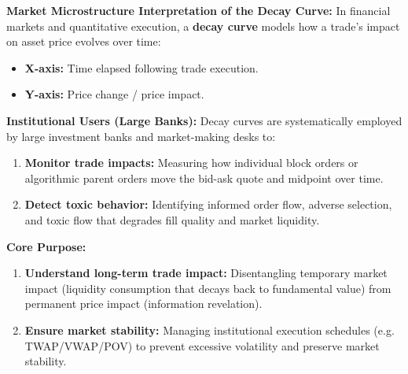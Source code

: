\begin{formulabox}
\textbf{Market Microstructure Interpretation of the Decay Curve:}
In financial markets and quantitative execution, a \textbf{decay curve} models how a trade's impact on asset price evolves over time:
\begin{itemize}[noitemsep, topsep=1pt]
    \item \textbf{X-axis:} Time elapsed following trade execution.
    \item \textbf{Y-axis:} Price change / price impact.
\end{itemize}

\vspace{0.4em}
\textbf{Institutional Users (Large Banks):}
Decay curves are systematically employed by large investment banks and market-making desks to:
\begin{enumerate}[noitemsep, topsep=1pt]
    \item \textbf{Monitor trade impacts:} Measuring how individual block orders or algorithmic parent orders move the bid-ask quote and midpoint over time.
    \item \textbf{Detect toxic behavior:} Identifying informed order flow, adverse selection, and toxic flow that degrades fill quality and market liquidity.
\end{enumerate}

\vspace{0.4em}
\textbf{Core Purpose:}
\begin{enumerate}[noitemsep, topsep=1pt]
    \item \textbf{Understand long-term trade impact:} Disentangling temporary market impact (liquidity consumption that decays back to fundamental value) from permanent price impact (information revelation).
    \item \textbf{Ensure market stability:} Managing institutional execution schedules (e.g. TWAP/VWAP/POV) to prevent excessive volatility and preserve market stability.
\end{enumerate}
\end{formulabox}

